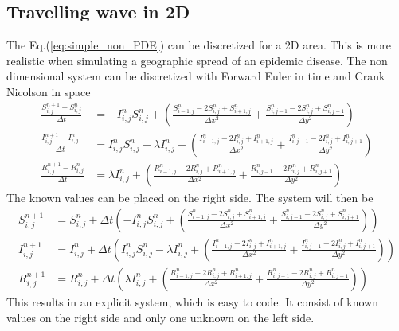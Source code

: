 \documentclass[%
twoside,                 %
final,                   %
10pt]{article}
\begin{document}
\subsection{Travelling wave in 2D}
The Eq.(\ref{eq:simple_non_PDE}) can be discretized for a 2D area. This is more realistic when simulating a geographic spread of an epidemic disease. The non dimensional system  can be discretized with Forward Euler in time and Crank Nicolson in space
\begin{equation} \label{eq:SIR_disc}
	\begin{aligned}
    \frac{S^{n+1}_{i,j}-S^n_{i,j}}{\Delta t} &= -I^{n}_{i,j}S^{n}_{i,j} + \left(\frac{S^{n}_{i-1,j}-2S^{n}_{i,j}+S^{n}_{i+1,j}}{\Delta x^2}+\frac{S^{n}_{i,j-1}-2S^{n}_{i,j}+S^{n}_{i,j+1}}{\Delta y^2}\right) \\
    \frac{I^{n+1}_{i,j}-I^n_{i,j}}{\Delta t} &= I^{n}_{i,j}S^{n}_{i,j} -\lambda I^{n}_{i,j} + \left(\frac{I^{n}_{i-1,j}-2I^{n}_{i,j}+I^{n}_{i+1,j}}{\Delta x^2}+\frac{I^{n}_{i,j-1}-2I^{n}_{i,j}+I^{n}_{i,j+1}}{\Delta y^2}\right) \\
    \frac{R^{n+1}_{i,j}-R^n_{i,j}}{\Delta t} &= \lambda I^{n}_{i,j}+\left(\frac{R^{n}_{i-1,j}-2R^{n}_{i,j}+R^{n}_{i+1,j}}{\Delta x^2}+\frac{R^{n}_{i,j-1}-2R^{n}_{i,j}+R^{n}_{i,j+1}}{\Delta y^2}\right) 
	\end{aligned}
\end{equation}
The known values can be placed on the right side. The system will then be
\begin{equation}
	\begin{aligned}
    S^{n+1}_{i,j} &= S^{n}_{i,j}+\Delta t\left(-I^{n}_{i,j}S^{n}_{i,j} + \left(\frac{S^{n}_{i-1,j}-2S^{n}_{i,j}+S^{n}_{i+1,j}}{\Delta x^2}+\frac{S^{n}_{i,j-1}-2S^{n}_{i,j}+S^{n}_{i,j+1}}{\Delta y^2}\right)\right) \\
    I^{n+1}_{i,j} &= I^{n}_{i,j}+\Delta t\left(I^{n}_{i,j}S^{n}_{i,j} -\lambda I^{n}_{i,j} + \left(\frac{I^{n}_{i-1,j}-2I^{n}_{i,j}+I^{n}_{i+1,j}}{\Delta x^2}+\frac{I^{n}_{i,j-1}-2I^{n}_{i,j}+I^{n}_{i,j+1}}{\Delta y^2}\right)\right) \\
    R^{n+1}_{i,j} &= R^{n}_{i,j}+\Delta t\left(\lambda I^{n}_{i,j}+\left(\frac{R^{n}_{i-1,j}-2R^{n}_{i,j}+R^{n}_{i+1,j}}{\Delta x^2}+\frac{R^{n}_{i,j-1}-2R^{n}_{i,j}+R^{n}_{i,j+1}}{\Delta y^2}\right)\right) 
	\end{aligned}
\end{equation}
This results in an explicit system, which is easy to code. It consist of known values on the right side and only one unknown on the left side.
\end{document}
